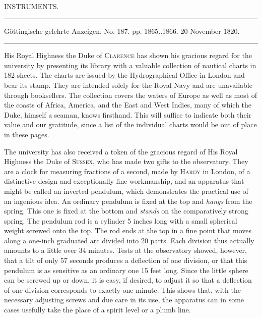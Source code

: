 \clearpage
{}
\begin{center}
{\large INSTRUMENTS.}
\end{center}

\begin{center}
\noindent\rule{\linewidth}{0.4pt}

Göttingische gelehrte Anzeigen. No. 187. pp. 1865..1866. 20 November 1820.

\noindent\rule{\linewidth}{0.4pt}
\end{center}

His Royal Highness the Duke of \textsc{Clarence} has shown his gracious regard for the university by presenting its library with a valuable collection of nautical charts in 182 sheets. The charts are issued by the Hydrographical Office in London and bear its stamp. They are intended solely for the Royal Navy and are unavailable through booksellers. The collection covers the waters of Europe as well as most of the coasts of Africa, America, and the East and West Indies, many of which the Duke, himself a seaman, knows firsthand. This will suffice to indicate both their value and our gratitude, since a list of the individual charts would be out of place in these pages.

The university has also received a token of the gracious regard of His Royal Highness the Duke of \textsc{Sussex}, who has made two gifts to the observatory. They are a clock for measuring fractions of a second, made by \textsc{Hardy} in London, of a distinctive design and exceptionally fine workmanship, and an apparatus that might be called an inverted pendulum, which demonstrates the practical use of an ingenious idea. An ordinary pendulum is fixed at the top and \emph{hangs} from the spring. This one is fixed at the bottom and \emph{stands} on the comparatively strong spring. The pendulum rod is a cylinder 5 inches long with a small spherical weight screwed onto the top. The rod ends at the top in a fine point that moves along a one-inch graduated arc divided into 20 parts. Each division thus actually amounts to a little over 34 minutes. Tests at the observatory showed, however, that a tilt of only 57 seconds produces a deflection of one division, or that this pendulum is as sensitive as an ordinary one 15 feet long. Since the little sphere can be screwed up or down, it is easy, if desired, to adjust it so that a deflection of one division corresponds to exactly one minute. This shows that, with the necessary adjusting screws and due care in its use, the apparatus can in some cases usefully take the place of a spirit level or a plumb line.

